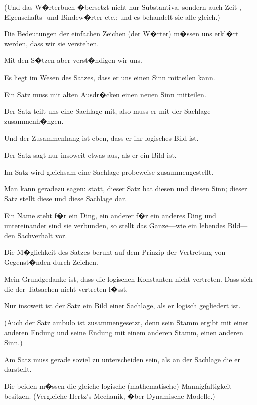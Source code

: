 \begin{propositions}
{(Und das W�rterbuch �bersetzt nicht nur
Substantiva, sondern auch \mbox{Zeit-,} Eigenschafts- und
Bindew�rter etc.; und es behandelt sie alle gleich.)}


{Die Bedeutungen der einfachen Zeichen (der
W�rter) m�ssen uns erkl�rt werden, dass wir sie
verstehen.

Mit den S�tzen aber verst�ndigen wir uns.}


{Es liegt im Wesen des Satzes, dass er uns einen
 Sinn mitteilen kann.}


{Ein Satz muss mit alten Ausdr�cken einen
neuen Sinn mitteilen.

Der Satz teilt uns eine Sachlage mit, also
muss er  mit der Sachlage zusammenh�ngen.

Und der Zusammenhang ist eben, dass er ihr
logisches Bild ist.

Der Satz sagt nur insoweit etwas aus, als er ein
Bild ist.}


{Im Satz wird gleichsam eine Sachlage probeweise
zusammengestellt.

Man kann geradezu sagen: statt, dieser Satz
hat diesen und diesen Sinn; dieser Satz stellt diese
und diese Sachlage dar.}


{Ein Name steht f�r ein Ding, ein anderer f�r
ein anderes Ding und untereinander sind sie
verbunden, so stellt das Ganze---wie ein lebendes
Bild---den Sachverhalt vor.}


{Die M�glichkeit des Satzes beruht auf dem
Prinzip der Vertretung von Gegenst�nden durch
Zeichen.

{\stretchyspace
Mein Grundgedanke ist, dass die \glqq{}logischen
Konstanten\grqq{} nicht vertreten. Dass sich die 
der Tatsachen nicht vertreten l�sst.}}


{Nur insoweit ist der Satz ein Bild einer Sachlage,
als er logisch gegliedert ist.

(Auch der Satz \glqq{}ambulo\grqq{} ist zusammengesetzt,
denn sein Stamm ergibt mit einer anderen Endung
und seine Endung mit einem anderen Stamm, einen
anderen Sinn.)}


{Am Satz muss gerade soviel zu unterscheiden
sein, als an der Sachlage die er darstellt.

{\stretchyspace
Die beiden m�ssen die gleiche logische (mathematische)
Mannigfaltigkeit besitzen. (Vergleiche
Hertz's Mechanik, �ber Dynamische Modelle.)}}



\end{propositions}
